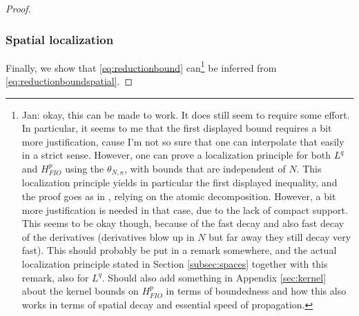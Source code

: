 \documentclass{amsart}
\numberwithin{equation}{section}
\theoremstyle{definition}
\newcommand {\ka}{\kappa}
\begin{document}
\begin{proof}
{\subsubsection*{Spatial localization}
Finally, we show that \eqref{eq:reductionbound} can\footnote{Jan: okay, this can be made to work. It does still seem to require some effort. In particular, it seems to me that the first displayed bound requires a bit more justification, cause I'm not so sure that one can interpolate that easily in a strict sense. However, one can prove a localization principle for both $L^{q}$ and $H^{p}_{FIO}$ using the $\theta_{N,\ka}$, with bounds that are independent of $N$. This localization principle yields in particular the first displayed inequality, and the proof goes as in \cite[Theorem 3.6]{LiRoSoYa24}, relying on the atomic decomposition. However, a bit more justification is needed in that case, due to the lack of compact support. This seems to be okay though, because of the fast decay and also fast decay of the derivatives (derivatives blow up in $N$ but far away they still decay very fast). This should probably be put in a remark somewhere, and the actual localization principle stated in Section \ref{subsec:spaces} together with this remark, also for $L^{q}$. Should also add something in Appendix \ref{sec:kernel} about the kernel bounds on $H^{p}_{FIO}$ in terms of boundedness and how this also works in terms of spatial decay and essential speed of propagation.} be inferred from \eqref{eq:reductionboundspatial}. 

}
\end{proof}
\end{document}
